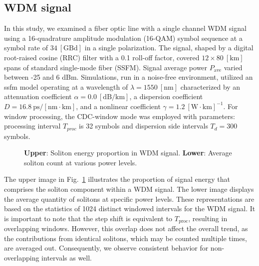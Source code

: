 \subsection{WDM signal}

In this study, we examined a fiber optic line with a single channel WDM signal using a 16-quadrature amplitude modulation (16-QAM) symbol sequence at a symbol rate of $34\ [\textrm{GBd}]$ in a single polarization. The signal, shaped by a digital root-raised cosine (RRC) filter with a 0.1 roll-off factor, covered $12 \times 80\ [\textrm{km}]$ spans of standard single-mode fiber (SSFM). Signal average power $P_{\mathrm{ave}}$ varied between -25 and 6 dBm. Simulations, run in a noise-free environment, utilized an \gls{ssfm} model operating at a wavelength of $\lambda = 1550\ [\textrm{nm}]$ characterized by an attenuation coefficient $\alpha = 0.0\ [\textrm{dB}/\textrm{km}]$, a dispersion coefficient $D = 16.8\ \textrm{ps}/[\textrm{nm} \cdot \textrm{km}]$, and a nonlinear coefficient $\gamma = 1.2\ [\textrm{W} \cdot \textrm{km}]^{-1}$. For window processing, the CDC-window mode was employed with parameters: processing interval $T_{proc}$ is 32 symbols and dispersion side intervals $T_d = 300$ symbols.


\begin{figure}[h]
    \caption{\textbf{Upper}: Soliton energy proportion in WDM signal. \textbf{Lower}: Average soliton count at various power levels.}
    \label{fig:ds_vs_power}
\end{figure}

The upper image in Fig.~\ref{fig:ds_vs_power} illustrates the proportion of signal energy that comprises the soliton component within a WDM signal. The lower image displays the average quantity of solitons at specific power levels. These representations are based on the statistics of 1024 distinct windowed intervals for the WDM signal. It is important to note that the step shift is equivalent to \( T_{\text{proc}} \), resulting in overlapping windows. However, this overlap does not affect the overall trend, as the contributions from identical solitons, which may be counted multiple times, are averaged out. Consequently, we observe consistent behavior for non-overlapping intervals as well.

